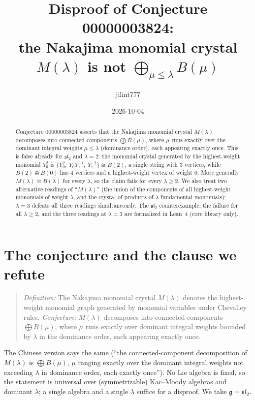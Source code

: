 \documentclass[11pt]{article}
\title{Disproof of Conjecture 00000003824:\\
the Nakajima monomial crystal $M(\lambda)$ is not $\bigoplus_{\mu\le\lambda}B(\mu)$}
\author{jilint777}
\date{2026-10-04}
\theoremstyle{definition}
\theoremstyle{remark}
\begin{document}
\sloppy
\maketitle

\begin{abstract}
Conjecture 00000003824 asserts that the Nakajima monomial crystal $M(\lambda)$
decomposes into connected components $\bigoplus B(\mu)$, where $\mu$ runs exactly
over the dominant integral weights $\mu\le\lambda$ (dominance order), each
appearing exactly once. This is false already for $\mathfrak{sl}_2$ and
$\lambda=2$: the monomial crystal generated by the highest-weight monomial
$Y_0^2$ is $\{Y_0^2,\ Y_0Y_1^{-1},\ Y_1^{-2}\}\cong B(2)$, a single string with
$3$ vertices, while $B(2)\oplus B(0)$ has $4$ vertices and a highest-weight
vertex of weight $0$. More generally $M(\lambda)\cong B(\lambda)$ for every
$\lambda$, so the claim fails for every $\lambda\ge2$. We also treat two
alternative readings of ``$M(\lambda)$'' (the union of the components of all
highest-weight monomials of weight $\lambda$, and the crystal of products of
$\lambda$ fundamental monomials); $\lambda=3$ defeats all three readings
simultaneously. The $\mathfrak{sl}_2$ counterexample, the failure for all
$\lambda\ge2$, and the three readings at $\lambda=3$ are formalized in Lean~4
(core library only).
\end{abstract}

\section{The conjecture and the clause we refute}
\begin{quote}
\emph{Definition:} The Nakajima monomial crystal $M(\lambda)$ denotes the
highest-weight monomial graph generated by monomial variables under Chevalley
rules. \emph{Conjecture:} $M(\lambda)$ decomposes into connected components
$\bigoplus B(\mu)$, where $\mu$ runs exactly over dominant integral weights
bounded by $\lambda$ in the dominance order, each appearing exactly once.
\end{quote}
The Chinese version says the same (``the connected-component decomposition of
$M(\lambda)$ is $\bigoplus B(\mu)$, $\mu$ ranging exactly over the dominant
integral weights not exceeding $\lambda$ in dominance order, each exactly
once''). No Lie algebra is fixed, so the statement is universal over
(symmetrizable) Kac--Moody algebras and dominant $\lambda$; a single
algebra and a single $\lambda$ suffice for a disproof. We take
$\mathfrak g=\mathfrak{sl}_2$.
\end{document}
